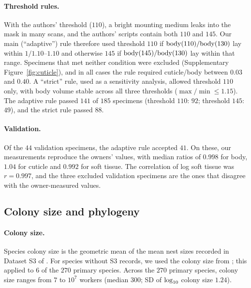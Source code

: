 \documentclass[11pt]{article}
\begin{document}
\paragraph{Threshold rules.} With the authors' threshold ($110$), a bright mounting medium leaks into the mask in many
scans, and the authors' scripts contain both $110$ and $145$. Our main (``adaptive'') rule therefore used threshold
$110$ if $\mathrm{body}(110)/\mathrm{body}(130)$ lay within $1/1.10$--$1.10$ and otherwise $145$ if $\mathrm{body}(145)/\mathrm{body}(130)$ lay within
that range. Specimens that met neither condition were excluded (Supplementary Figure~\ref{fig:cuticle}), and in all
cases the rule required cuticle/body between $0.03$ and $0.40$. A ``strict'' rule, used as a sensitivity analysis,
allowed threshold $110$ only, with body volume stable across all three thresholds ($\max/\min \le 1.15$). The adaptive
rule passed $141$ of $185$ specimens (threshold $110$: $92$; threshold $145$: $49$), and the strict rule passed $88$.

\paragraph{Validation.} Of the $44$ validation specimens, the adaptive rule accepted $41$. On these, our measurements
reproduce the owners' values, with median ratios of $0.998$ for body, $1.04$ for cuticle and $0.992$ for soft tissue.
The correlation of log soft tissue was $r = 0.997$, and the three excluded validation specimens are the ones that
disagree with the owner-measured values.

\subsection{Colony size and phylogeny}\label{sec:colony}

\paragraph{Colony size.} Species colony size is the geometric mean of the mean nest sizes recorded in Dataset S3 of
\citet{matte2025}. For species without S3 records, we used the colony size from \citet{bellroberts2024}; this applied
to $6$ of the $270$ primary species. Across the $270$ primary species, colony size ranges from $7$ to $10^{7}$ workers
(median $300$; SD of $\log_{10}$ colony size $1.24$).
\end{document}
